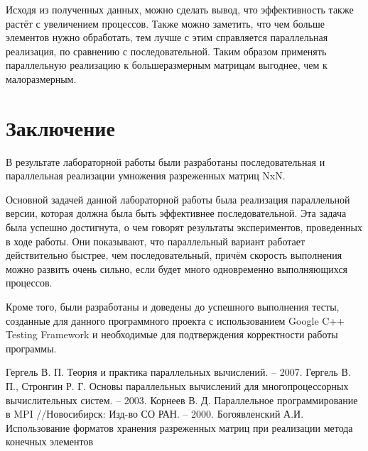 \documentclass{report}
\begin{document}
\par Исходя из полученных данных, можно сделать вывод, что эффективность также растёт с увеличением процессов. Также можно заметить, что чем больше элементов нужно обработать, тем лучше с этим справляется параллельная реализация, по сравнению с последовательной. Таким образом применять параллельную реализацию к большеразмерным матрицам выгоднее, чем к малоразмерным.
\newpage

\section*{Заключение}
В результате лабораторной работы были разработаны последовательная и параллельная реализации умножения разреженных матриц NxN.
\par Основной задачей данной лабораторной работы была реализация параллельной версии, которая должна была быть эффективнее последовательной. Эта задача была успешно достигнута, о чем говорят результаты экспериментов, проведенных в ходе работы. Они показывают, что параллельный вариант работает действительно быстрее, чем последовательный, причём скорость выполнения можно развить очень сильно, если будет много одновременно выполняющихся процессов.
\par Кроме того, были разработаны и доведены до успешного выполнения тесты, созданные для данного программного проекта с использованием Google C++ Testing Framework и необходимые для подтверждения корректности работы программы.
\newpage

\begin{thebibliography}{1}
Гергель В. П. Теория и практика параллельных вычислений. – 2007. 
Гергель В. П., Стронгин Р. Г. Основы параллельных вычислений для многопроцессорных вычислительных систем. – 2003.
Корнеев В. Д. Параллельное программирование в MPI //Новосибирск: Изд-во СО РАН. – 2000.
Богоявленский А.И. Использование форматов хранения разреженных матриц при реализации метода конечных элементов
\end{thebibliography}
\newpage

\end{document}

